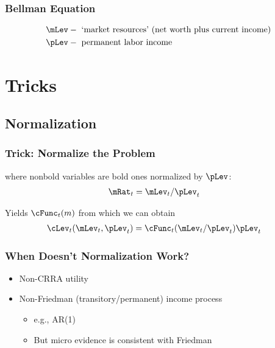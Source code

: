 \documentclass{beamer}
\begin{document}
\begin{frame}[label=vrecurse]
\frametitle{\large\textbf{Bellman Equation}}



\begin{equation*}\begin{gathered}\begin{aligned}
   \mLev  & - \text{ `market resources' (net worth plus current income)}
\\ \pLev  & - \text{ permanent labor income }
\end{aligned}\end{gathered}\end{equation*}

\end{frame}

\section{Tricks}
\subsection{Normalization}
\begin{frame}[label=Normalize]
\frametitle{\large\textbf{Trick: Normalize the Problem}}



where nonbold variables are bold ones normalized by $\pLev$:
\begin{equation}\begin{gathered}\begin{aligned}
\mRat_{t}  & = \mLev_{t}/\pLev_{t}
\end{aligned}\end{gathered}\end{equation}

Yields $\cFunc_{t}(m)$ from which we can obtain
\begin{equation}\begin{gathered}\begin{aligned}
  \cLev_{t}(\mLev_{t},\pLev_{t})  & = \cFunc_{t}(\mLev_{t}/\pLev_{t})\pLev_{t}
\end{aligned}\end{gathered}\end{equation}

\end{frame}

\begin{frame}[label=Normalize]
\frametitle{\large\textbf{When Doesn't Normalization Work?}}

\begin{itemize}
\item Non-CRRA utility
\item Non-Friedman (transitory/permanent) income process
\begin{itemize}
\item e.g., AR(1)
\item But micro evidence is consistent with Friedman
\end{itemize}
\end{itemize}

\end{frame}
\end{document}
